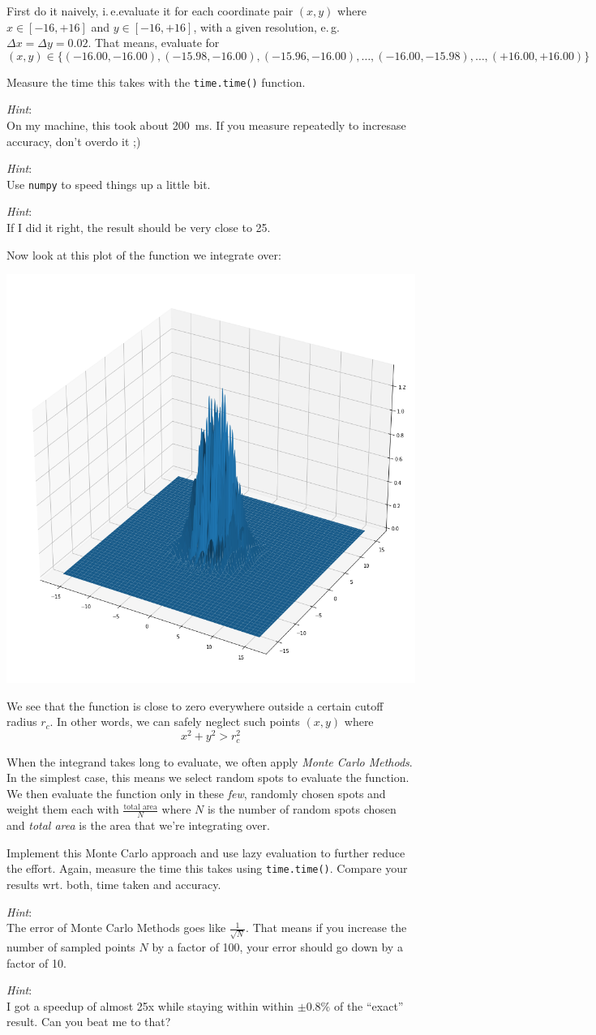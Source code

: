 \documentclass[
	english,
	fontsize=10pt,
	parskip=half,
	titlepage=true,
	DIV=12
]{scrartcl}
\newcommand*{\ie}{i.\,e.}
\newcommand*{\eg}{e.\,g.}
\begin{document}
First do it naively, \ie evaluate it for each coordinate pair $(x, y)$ where $x \in [-16, +16]$ and $y \in [-16, +16]$, with a given resolution, \eg $\Delta x = \Delta y = 0.02$. That means, evaluate for
\[ (x, y) \in \{(-16.00, -16.00), (-15.98, -16.00), (-15.96, -16.00), \ldots, (-16.00, -15.98), \ldots, (+16.00, +16.00) \} \]

Measure the time this takes with the \texttt{time.time()} function.

\emph{Hint}:\\
On my machine, this took about \SI{200}{ms}. If you measure repeatedly to incresase accuracy, don't overdo it ;)

\emph{Hint}:\\
Use \texttt{numpy} to speed things up a little bit.

\emph{Hint}:\\
If I did it right, the result should be very close to 25.

Now look at this plot of the function we integrate over:
\begin{center}
	\includegraphics[width=0.6\linewidth]{func}
\end{center}

We see that the function is close to zero everywhere outside a certain cutoff radius $r_c$. In other words, we can safely neglect such points $(x, y)$ where
\[ x^2 + y^2 > r_c^2 \]

When the integrand takes long to evaluate, we often apply \emph{Monte Carlo Methods}. In the simplest case, this means we select random spots to evaluate the function. We then evaluate the function only in these \emph{few}, randomly chosen spots and weight them each with $\frac{\text{total area}}{N}$ where $N$ is the number of random spots chosen and \emph{total area} is the area that we're integrating over.

Implement this Monte Carlo approach and use lazy evaluation to further reduce the effort. Again, measure the time this takes using \texttt{time.time()}. Compare your results wrt. both, time taken and accuracy.

\emph{Hint}:\\
The error of Monte Carlo Methods goes like $\frac{1}{\sqrt{N}}$. That means if you increase the number of sampled points $N$ by a factor of 100, your error should go down by a factor of 10.

\emph{Hint}:\\
I got a speedup of almost 25x while staying within within $\pm 0.8\%$ of the \enquote{exact} result. Can you beat me to that?
\end{document}
